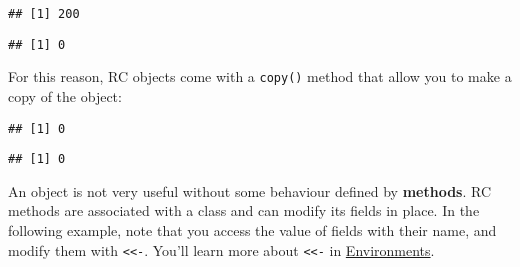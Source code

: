 \begin{verbatim}
## [1] 200
\end{verbatim}

\begin{Shaded}
\begin{Highlighting}[]
\OperatorTok{$}\StringTok{ }
\OperatorTok{$}
\end{Highlighting}
\end{Shaded}

\begin{verbatim}
## [1] 0
\end{verbatim}

For this reason, RC objects come with a \texttt{copy()} method that
allow you to make a copy of the object:

\begin{Shaded}
\begin{Highlighting}[]
\StringTok{ }\OperatorTok{$}\NormalTok{()}
\OperatorTok{$}
\end{Highlighting}
\end{Shaded}

\begin{verbatim}
## [1] 0
\end{verbatim}

\begin{Shaded}
\begin{Highlighting}[]
\OperatorTok{$}\StringTok{ }
\OperatorTok{$}
\end{Highlighting}
\end{Shaded}

\begin{verbatim}
## [1] 0
\end{verbatim}

An object is not very useful without some behaviour defined by
\textbf{methods}. RC methods are associated with a class and can modify
its fields in place. In the following example, note that you access the
value of fields with their name, and modify them with
\texttt{\textless{}\textless{}-}. You'll learn more about
\texttt{\textless{}\textless{}-} in
\protect\hyperlink{binding}{Environments}. 
 \indexc{<<-}

